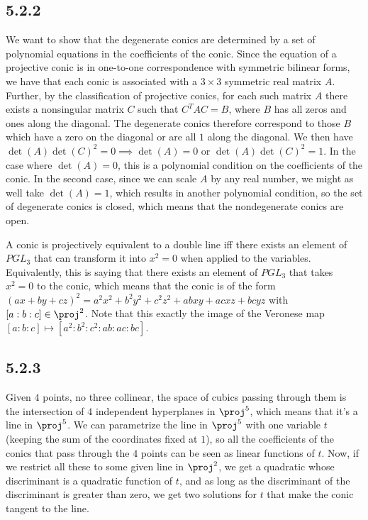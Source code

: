 \documentclass{article}
\begin{document}
\subsection*{5.2.2}
We want to show that the degenerate conics are determined by a set of polynomial equations in the coefficients of the conic. Since the equation of a projective conic is in one-to-one correspondence with symmetric bilinear forms, we have that each conic is associated with a $3\times3$ symmetric real matrix $A$. Further, by the classification of projective conics, for each such matrix $A$ there exists a nonsingular matrix $C$ such that $C^TAC=B$, where $B$ has all zeros and ones along the diagonal. The degenerate conics therefore correspond to those $B$ which have a zero on the diagonal or are all $1$ along the diagonal. We then have $\det(A)\det(C)^2=0\implies \det(A)=0$ or $\det(A)\det(C)^2=1$. In the case where $\det(A)=0$, this is a polynomial condition on the coefficients of the conic. In the second case, since we can scale $A$ by any real number, we might as well take $\det(A)=1$, which results in another polynomial condition, so the set of degenerate conics is closed, which means that the nondegenerate conics are open.

A conic is projectively equivalent to a double line iff there exists an element of $PGL_3$ that can transform it into $x^2=0$ when applied to the variables. Equivalently, this is saying that there exists an element of $PGL_3$ that takes $x^2=0$ to the conic, which means that the conic is of the form $(ax+by+cz)^2=a^2x^2+b^2y^2+c^2z^2+abxy+acxz+bcyz$ with $[a:b:c]\in\proj^2$. Note that this exactly the image of the Veronese map $[a:b:c]\mapsto [a^2:b^2:c^2:ab:ac:bc]$.
\subsection*{5.2.3}
Given $4$ points, no three collinear, the space of cubics passing through them is the intersection of $4$ independent hyperplanes in $\proj^5$, which means that it's a line in $\proj^5$. We can parametrize the line in $\proj^5$ with one variable $t$ (keeping the sum of the coordinates fixed at $1$), so all the coefficients of the conics that pass through the $4$ points can be seen as linear functions of $t$. Now, if we restrict all these to some given line in $\proj^2$, we get a quadratic whose discriminant is a quadratic function of $t$, and as long as the discriminant of the discriminant is greater than zero, we get two solutions for $t$ that make the conic tangent to the line. 
\end{document}
